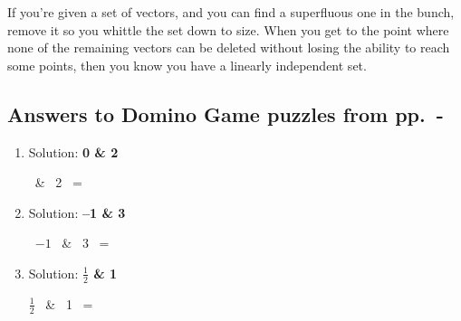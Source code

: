 If you're given a set of vectors, and you can find a superfluous one in the
bunch, remove it so you whittle the set down to size. When you get to the point
where none of the remaining vectors can be deleted without losing the ability
to reach some points, then you know you have a linearly independent set.

\pagebreak
\subsection*{Answers to Domino Game puzzles from
pp.~\pageref{startDominoPuzzles}-\pageref{endDominoPuzzes}}
\label{dominoPuzzleAnswers}

\begin{enumerate}
\itemsep1em

\item {Solution: \textbf{0 \& 2}}

  \ \& \
2  \ = \
 \quad

\item {Solution: \textbf{--1 \& 3}}

\ $-1$  \ \& \
3  \ = \
 \quad

\item {Solution: \textbf{$\frac{1}{2}$ \& 1}}

\quad $\frac{1}{2}$  \ \& \
1  \ = \
 \quad


\end{enumerate}

